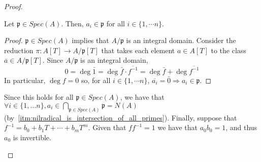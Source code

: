 \begin{problem}
\begin{enumerate}[label=(\theproblem.\arabic*),ref=\theproblem.\arabic*]
\begin{sol}
\begin{proof}
\begin{itemize}
\begin{claim}
                            Let $\mathfrak{p} \in Spec(A)$.
                            Then, $a_i \in \mathfrak{p}$ for all $i \in \{1, \cdots n\}$.
                            \begin{proof}
                                $\mathfrak{p} \in Spec(A)$ implies that $A/\mathfrak{p}$ is an integral domain.
                                Consider the reduction $\pi: A[T] \rightarrow A/\mathfrak{p}[T]$ that takes each element $a \in A[T]$ to the class $\overline{a} \in A/\mathfrak{p}[T]$.
                                Since $A/\mathfrak{p}$ is an integral domain,
                                \[
                                    0 = \deg \bar{1} = \deg \bar{f} \cdot \overline{f^{-1}} =
                                    \deg \bar{f} + \deg \overline{f^{-1}}
                                \]
                                In particular, $\deg f = 0$ so, for all $i \in \{1, \cdots n\}$,
                                $\overline{a_i} = \bar{0} \Rightarrow a_i \in \mathfrak{p}$.
                            \end{proof}
                        \end{claim}
                        Since this holds for all $\mathfrak{p} \in Spec(A)$, we have that $ \forall i \in \{1, \ldots n\},
                        a_i \in \bigcap_{\mathfrak{p} \in Spec(A)}\mathfrak{p} = N(A)$ (by~\ref{itm:nilradical_is_intersection_of_all_primes}).
                        Finally, suppose that $f^{-1} = b_0 + b_1 T + \cdots + b_m T^m$.
                        Given that $f f^{-1}=1$ we have that $a_0 b_0 = 1$, and thus $a_0$ is invertible.
                    \end{itemize}
                \end{proof}
            \end{sol}


\end{enumerate}
\end{problem}
